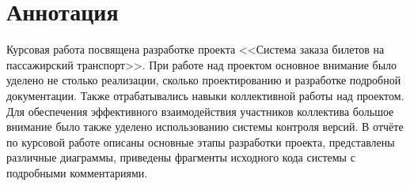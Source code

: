 \section{Аннотация}

Курсовая работа посвящена разработке проекта <<Система заказа билетов на пассажирский транспорт>>. При работе над проектом основное внимание было уделено не столько реализации, сколько проектированию и разработке подробной документации. Также отрабатывались навыки коллективной работы над проектом. Для обеспечения эффективного взаимодействия участников коллектива большое внимание было также уделено использованию системы контроля версий. В отчёте по курсовой работе описаны основные этапы разработки проекта, представлены различные диаграммы, приведены фрагменты исходного кода системы с подробными комментариями.

\endinput
